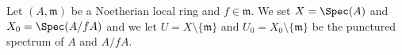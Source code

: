 \begin{situation}
\label{situation-local-lefschetz}
Let $(A, \mathfrak m)$ be a Noetherian local ring and $f \in \mathfrak m$.
We set $X = \Spec(A)$ and $X_0 = \Spec(A/fA)$ and we
let $U = X \setminus \{\mathfrak m\}$ and
$U_0 = X_0 \setminus \{\mathfrak m\}$ be the punctured spectrum of
$A$ and $A/fA$.
\end{situation}